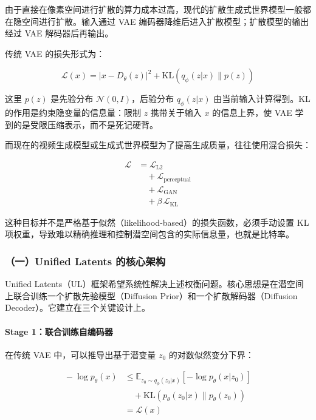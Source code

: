 由于直接在像素空间进行扩散的算力成本过高，现代的扩散生成式世界模型一般都在隐空间进行扩散。输入通过 VAE 编码器降维后进入扩散模型；扩散模型的输出经过 VAE 解码器后再输出。

传统 VAE 的损失形式为：

\[
\mathcal{L}(x)=|x-D_\theta(z)|^2+\mathrm{KL}(q_\phi(z|x)\|p(z))
\]

这里 \(p(z)\) 是先验分布 \(\mathcal{N}(0,I)\)，后验分布 \(q_\phi(z|x)\) 由当前输入计算得到。KL 的作用是约束隐变量的信息量：限制 \(z\) 携带关于输入 \(x\) 的信息上界，使 VAE 学到的是受限压缩表示，而不是死记硬背。

而现在的视频生成模型或生成式世界模型为了提高生成质量，往往使用混合损失：

\[
\begin{aligned}
\mathcal{L}
&= \mathcal{L}_{\mathrm{L2}}
\\
&\quad + \mathcal{L}_{\mathrm{perceptual}}
\\
&\quad + \mathcal{L}_{\mathrm{GAN}}
\\
&\quad + \beta\,\mathcal{L}_{\mathrm{KL}}
\end{aligned}
\]

这种目标并不是严格基于似然（likelihood-based）的损失函数，必须手动设置 KL 项权重，导致难以精确推理和控制潜空间包含的实际信息量，也就是比特率。

\hypertarget{ux4e00unified-latents-ux7684ux6838ux5fc3ux67b6ux6784}{%
\subsubsection{（一）Unified Latents 的核心架构}\label{ux4e00unified-latents-ux7684ux6838ux5fc3ux67b6ux6784}}

Unified Latents（UL）框架希望系统性解决上述权衡问题。核心思想是在潜空间上联合训练一个扩散先验模型（Diffusion Prior）和一个扩散解码器（Diffusion Decoder）。它建立在三个关键设计上。

\hypertarget{stage-1ux8054ux5408ux8badux7ec3ux81eaux7f16ux7801ux5668}{%
\paragraph{Stage 1：联合训练自编码器}\label{stage-1ux8054ux5408ux8badux7ec3ux81eaux7f16ux7801ux5668}}

在传统 VAE 中，可以推导出基于潜变量 \(z_0\) 的对数似然变分下界：

\[
\begin{aligned}
{}-\log p_\theta(x)
&\le
\mathbb{E}_{z_0\sim q_\phi(z_0|x)}
\left[-\log p_\theta(x|z_0)\right]
\\
&\quad +
\mathrm{KL}(p_\theta(z_0|x)\|p_\theta(z_0))
\\
&=
\mathcal{L}(x)
\end{aligned}
\]

